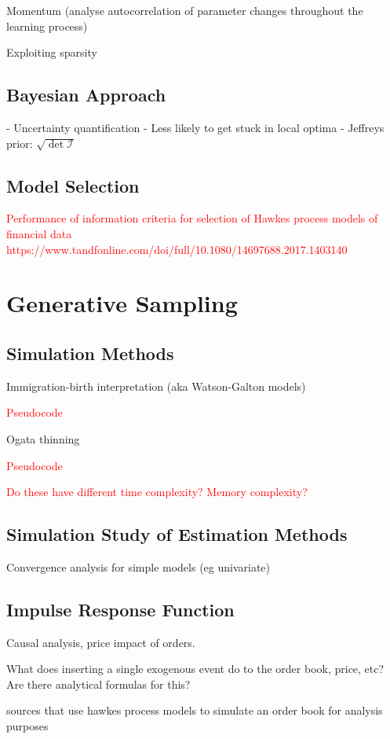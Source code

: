 \documentclass[honours,12pt]{unswthesis}
\numberwithin{equation}{section}
\begin{document}
Momentum (analyse autocorrelation of parameter changes throughout the learning process)

Exploiting sparsity \cite{NickelLe}

\section{Bayesian Approach}
- Uncertainty quantification
- Less likely to get stuck in local optima
- Jeffreys prior: $\sqrt{\det \mathcal{I}}$

\section{Model Selection}

\textcolor{red}{Performance of information criteria for selection of Hawkes process models of financial data https://www.tandfonline.com/doi/full/10.1080/14697688.2017.1403140}

\chapter{Generative Sampling}
\section{Simulation Methods}
Immigration-birth interpretation \cite{MorariuPatrichiPakkanen}
(aka Watson-Galton models)

\textcolor{red}{Pseudocode}

Ogata thinning 

\textcolor{red}{Pseudocode}

\textcolor{red}{Do these have different time complexity? Memory complexity?}

\section{Simulation Study of Estimation Methods}
Convergence analysis for simple models (eg univariate)

\section{Impulse Response Function}
Causal analysis, price impact of orders.

What does inserting a single exogenous event do to the order book, price, etc? Are there analytical formulas for this?


\cite{AbergelJedidi} \cite{Toke} sources that use hawkes process models to simulate an order book for analysis purposes
\end{document}
